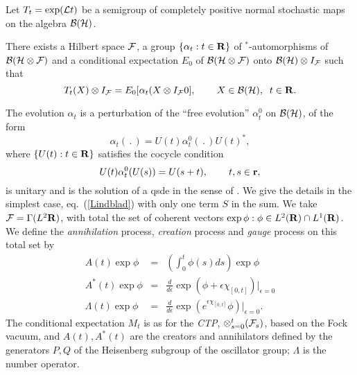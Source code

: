 Let $T_t=\exp({\cal L}t)$ be a semigroup of completely positive normal
stochastic maps on the algebra ${\cal B}({\cal H})$.
\begin{theorem}
There exists a Hilbert space ${\cal F}$, a group $\{\alpha_t:t\in{\bf R}\}$
of $^*$-automorphisms of ${\cal B}({\cal H}\otimes{\cal F})$ and a
conditional expectation $E_0$ of ${\cal B}({\cal H}\otimes{\cal F})$
onto ${\cal B}({\cal H})\otimes I_{\cal F}$ such that
\begin{equation}
T_t(X)\otimes I_{\cal F}=E_0[\alpha_t(X\otimes I_{\cal F}0],\hspace{.3in}
X\in{\cal B}({\cal H}),\;\;t\in{\bf R}.
\end{equation}
\end{theorem}
The evolution $\alpha_t$ is a perturbation of the ``free evolution''
$\alpha_t^0$ on ${\cal B}({\cal H})$, of the form
\begin{equation}
\alpha_t(\,.\,)=U(t)\alpha_t^0(\,.\,)U(t)^*,
\end{equation}
where $\{U(t):t\in{\bf R}\}$ satisfies the cocycle condition
\begin{equation}
U(t)\alpha_t^0(U(s))=U(s+t),\hspace{.3in}t,s\in{\bf r},
\end{equation}
is unitary and is the solution of a qsde in the sense of
\cite{Hudson3,Partha2}. We give the details in the simplest case,
eq.~(\ref{Lindblad}) with only one term $S$ in the sum. We take ${\cal F}=
\Gamma(L^2{\bf R})$, with total the set of coherent vectors $\exp\phi:\phi
\in L^2({\bf R})\cap L^1({\bf R})$. We define the {\em annihilation} process,
{\em creation} process and {\em gauge} process on this total set by
\begin{eqnarray}
A(t)\exp\phi&=&(\int_0^t\phi(s)ds)\exp\phi\\
A^*(t)\exp\phi&=&\frac{d}{d\epsilon}\exp\left(\phi+\epsilon\chi_{[0,t]}
\right)|_{\epsilon=0}\\
\Lambda(t)\exp\phi&=&\frac{d}{d\epsilon}\exp\left(e^{\epsilon\chi_{[0,t]}}
\phi\right)|_{\epsilon=0}.
\end{eqnarray}
The conditional expectation $M_t$ is as for the {\em CTP},
$\otimes_{s=0}^t({\cal F}_s)$, based on the Fock vacuum, and
$A(t),A^*(t)$ are the creators and annihilators defined by
the generators $P,Q$ of the Heisenberg
subgroup of the oscillator group; $\Lambda$ is the number operator.


